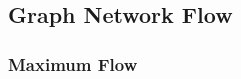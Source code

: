 \documentclass{article} %
\theoremstyle{bfnote}
\newtheorem{definition}[theorem]{Definition}
\begin{document}
%
%
%
%

\subsection{Graph Network Flow}

\subsubsection{Maximum Flow}
\end{document}
